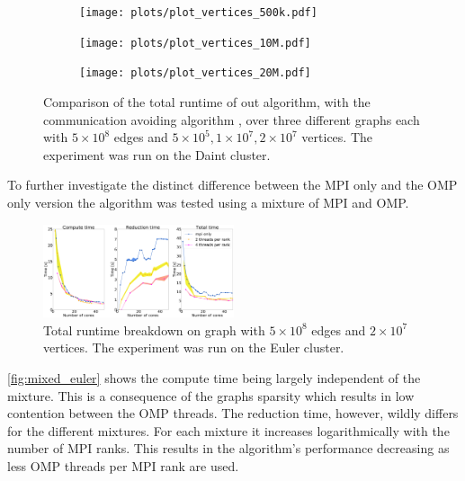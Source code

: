 \newlength{\fsize}
\setlength{\fsize}{0.5\textwidth}
\begin{figure}
    \begin{subfigure}[c]{\fsize}
        \texttt{[image: plots/plot\_vertices\_500k.pdf]}
        \label{fig:mpi_omp_commavoiding_daint_1}
    \end{subfigure}
\begin{subfigure}[c]{\fsize}
    \texttt{[image: plots/plot\_vertices\_10M.pdf]}
    \label{fig:mpi_omp_commavoiding_daint_2}
\end{subfigure}
    \begin{subfigure}[c]{\fsize}
        \texttt{[image: plots/plot\_vertices\_20M.pdf]}
\label{fig:mpi_omp_commavoiding_daint_3}
    \end{subfigure}
    \caption{Comparison of the total runtime of out algorithm, with the communication avoiding
    algorithm \cite{comm_avoiding}, over three different graphs each with $5\times10^{8}$ edges
    and $5\times10^5, 1\times10^7, 2\times10^7$ vertices. The experiment was run on the Daint
cluster.}
    \label{fig:mpi_omp_commavoiding_daint}
\end{figure}

To further investigate the distinct difference between the MPI only and the OMP only version the
algorithm was tested using a mixture of MPI and OMP.

\begin{figure}
\includegraphics[width=0.5\textwidth]{plots/20000mpi_mixtures_with_everything}
\caption{Total runtime breakdown on graph with $5\times10^{8}$ edges and $2\times10^{7}$ vertices.
The experiment was run on the Euler cluster.}
\label{fig:mixed_euler}
\end{figure}

\autoref{fig:mixed_euler} shows the compute time being largely independent of the mixture. This is
a consequence of the graphs sparsity which results in low contention between the OMP threads. The
reduction time, however, wildly differs for the different mixtures. For each mixture it increases
logarithmically with the number of MPI ranks. This results in the algorithm's performance
decreasing as less OMP threads per MPI rank are used.

